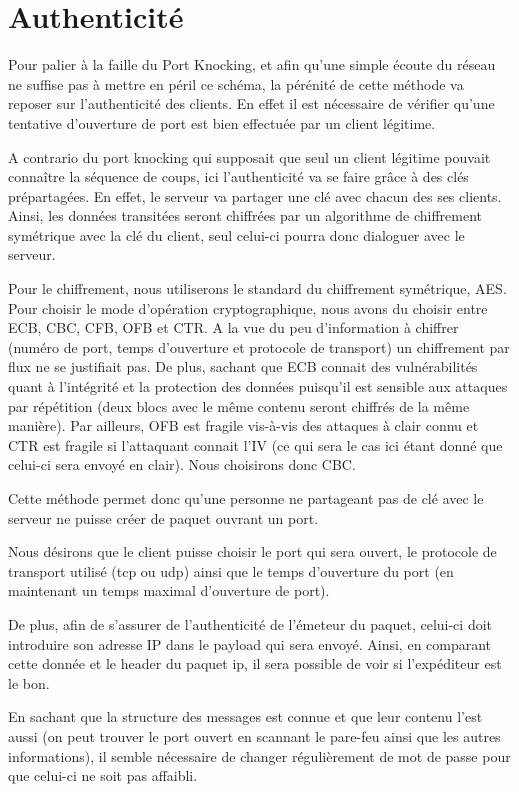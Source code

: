 \chapter{Authenticité}

Pour palier à la faille du Port Knocking, et afin qu'une simple écoute du réseau ne suffise pas à mettre en péril ce schéma, la pérénité de cette méthode va reposer sur l'authenticité des clients. En effet il est nécessaire de vérifier qu'une tentative d'ouverture de port est bien effectuée par un client légitime.

A contrario du port knocking qui supposait que seul un client légitime pouvait connaître la séquence de coups, ici l'authenticité va se faire grâce à des clés prépartagées. En effet, le serveur va partager une clé avec chacun des ses clients. Ainsi, les données transitées seront chiffrées par un algorithme de chiffrement symétrique avec la clé du client, seul celui-ci pourra donc dialoguer avec le serveur. 

Pour le chiffrement, nous utiliserons le standard du chiffrement symétrique, AES. 
Pour choisir le mode d'opération cryptographique, nous avons du choisir entre ECB, CBC, CFB, OFB et CTR. 
A la vue du peu d'information à chiffrer (numéro de port, temps d'ouverture et protocole de transport) un chiffrement par flux ne se justifiait pas.
De plus, sachant que ECB connait des vulnérabilités quant à l'intégrité et la protection des données puisqu'il est sensible aux attaques par répétition (deux blocs avec le même contenu seront chiffrés de la même manière).
Par ailleurs, OFB est fragile vis-à-vis des attaques à clair connu et CTR est fragile si l'attaquant connait l'IV (ce qui sera le cas ici étant donné que celui-ci sera envoyé en clair).
Nous choisirons donc CBC.

Cette méthode permet donc qu'une personne ne partageant pas de clé avec le serveur ne puisse créer de paquet ouvrant un port.

Nous désirons que le client puisse choisir le port qui sera ouvert, le protocole de transport utilisé (tcp ou udp) ainsi que le temps d'ouverture du port (en maintenant un temps maximal d'ouverture de port).

De plus, afin de s'assurer de l'authenticité de l'émeteur du paquet, celui-ci doit introduire son adresse IP dans le payload qui sera envoyé. Ainsi, en comparant cette donnée et le header du paquet ip, il sera possible de voir si l'expéditeur est le bon.

En sachant que la structure des messages est connue et que leur contenu l'est aussi (on peut trouver le port ouvert en scannant le pare-feu ainsi que les autres informations), il semble nécessaire de changer régulièrement de mot de passe pour que celui-ci ne soit pas affaibli.


